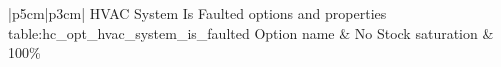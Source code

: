 \begin{customLongTable}{ |p{5cm}|p{3cm}| }
{HVAC System Is Faulted options and properties} {table:hc_opt_hvac_system_is_faulted}
{Option name & No}
\endhead
\hline
Stock saturation & 100\% \\ \hline
\end{customLongTable}

